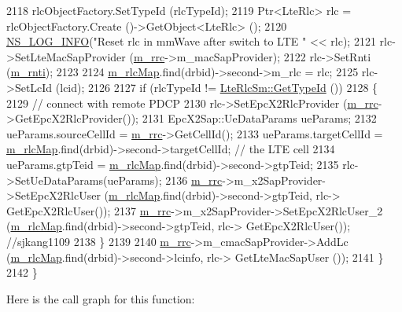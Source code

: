 \begin{DoxyCode}
2118     rlcObjectFactory.SetTypeId (rlcTypeId);
2119     Ptr<LteRlc> rlc = rlcObjectFactory.Create ()->GetObject<LteRlc> ();
2120     \hyperlink{group__logging_gafbd73ee2cf9f26b319f49086d8e860fb}{NS\_LOG\_INFO}(\textcolor{stringliteral}{"Reset rlc in mmWave after switch to LTE "} << rlc);
2121     rlc->SetLteMacSapProvider (\hyperlink{classns3_1_1UeManager_ab4405e9f354c66e7c1a4c95832290f5b}{m\_rrc}->m\_macSapProvider);
2122     rlc->SetRnti (\hyperlink{classns3_1_1UeManager_a5a72b4fe818f21993bd7f05d7e2c4f83}{m\_rnti});
2123 
2124     \hyperlink{classns3_1_1UeManager_a64f37a901db7a322552ba08d87e65770}{m\_rlcMap}.find(drbid)->second->m\_rlc = rlc;
2125     rlc->SetLcId (lcid);
2126 
2127     \textcolor{keywordflow}{if} (rlcTypeId != \hyperlink{classns3_1_1LteRlcSm_a160bd39ce4e0d113dd5d93cc3a258045}{LteRlcSm::GetTypeId} ())
2128     \{
2129       \textcolor{comment}{// connect with remote PDCP}
2130       rlc->SetEpcX2RlcProvider (\hyperlink{classns3_1_1UeManager_ab4405e9f354c66e7c1a4c95832290f5b}{m\_rrc}->GetEpcX2RlcProvider());
2131       EpcX2Sap::UeDataParams ueParams;
2132       ueParams.sourceCellId = \hyperlink{classns3_1_1UeManager_ab4405e9f354c66e7c1a4c95832290f5b}{m\_rrc}->GetCellId();
2133       ueParams.targetCellId = \hyperlink{classns3_1_1UeManager_a64f37a901db7a322552ba08d87e65770}{m\_rlcMap}.find(drbid)->second->targetCellId; \textcolor{comment}{// the LTE cell}
2134       ueParams.gtpTeid = \hyperlink{classns3_1_1UeManager_a64f37a901db7a322552ba08d87e65770}{m\_rlcMap}.find(drbid)->second->gtpTeid;
2135       rlc->SetUeDataParams(ueParams);
2136       \hyperlink{classns3_1_1UeManager_ab4405e9f354c66e7c1a4c95832290f5b}{m\_rrc}->m\_x2SapProvider->SetEpcX2RlcUser (\hyperlink{classns3_1_1UeManager_a64f37a901db7a322552ba08d87e65770}{m\_rlcMap}.find(drbid)->second->gtpTeid, rlc->
      GetEpcX2RlcUser());
2137       \hyperlink{classns3_1_1UeManager_ab4405e9f354c66e7c1a4c95832290f5b}{m\_rrc}->m\_x2SapProvider->SetEpcX2RlcUser\_2 (\hyperlink{classns3_1_1UeManager_a64f37a901db7a322552ba08d87e65770}{m\_rlcMap}.find(drbid)->second->gtpTeid, rlc->
      GetEpcX2RlcUser()); \textcolor{comment}{//sjkang1109}
2138     \}
2139 
2140     \hyperlink{classns3_1_1UeManager_ab4405e9f354c66e7c1a4c95832290f5b}{m\_rrc}->m\_cmacSapProvider->AddLc (\hyperlink{classns3_1_1UeManager_a64f37a901db7a322552ba08d87e65770}{m\_rlcMap}.find(drbid)->second->lcinfo, rlc->
      GetLteMacSapUser ());
2141   \}
2142 \}
\end{DoxyCode}


Here is the call graph for this function\+:


